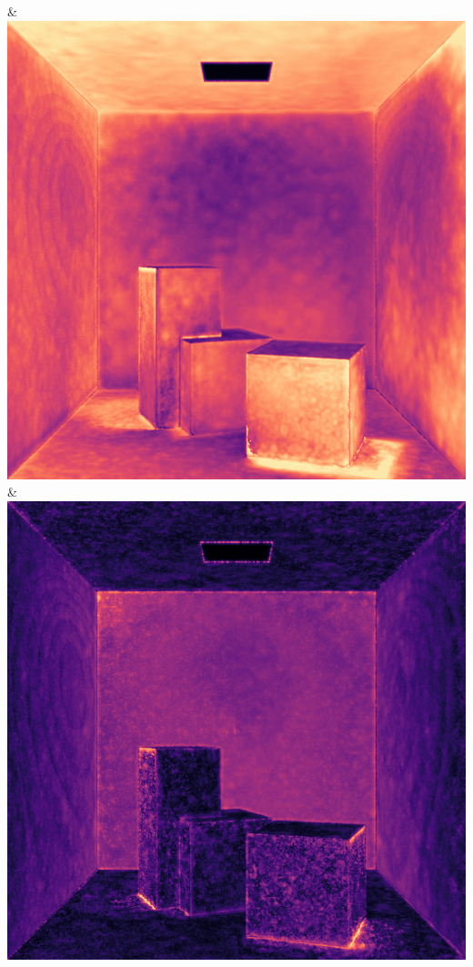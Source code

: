 & \includegraphics[width=\linewidth]{figures/py/tests/quality_comparison/nrc+lt_1spp_diffuse_flip.png}
& \includegraphics[width=\linewidth]{figures/py/tests/quality_comparison/nrc+sppc_1spp_diffuse_flip.png}
